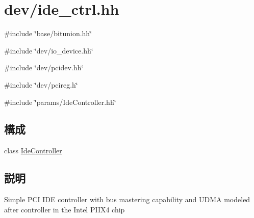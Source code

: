 \hypertarget{ide__ctrl_8hh}{
\section{dev/ide\_\-ctrl.hh}
\label{ide__ctrl_8hh}
}
{\ttfamily \#include \char`\"{}base/bitunion.hh\char`\"{}}\par
{\ttfamily \#include \char`\"{}dev/io\_\-device.hh\char`\"{}}\par
{\ttfamily \#include \char`\"{}dev/pcidev.hh\char`\"{}}\par
{\ttfamily \#include \char`\"{}dev/pcireg.h\char`\"{}}\par
{\ttfamily \#include \char`\"{}params/IdeController.hh\char`\"{}}\par
\subsection*{構成}
\begin{DoxyCompactItemize}
\item 
class \hyperlink{classIdeController}{IdeController}
\end{DoxyCompactItemize}


\subsection{説明}
Simple PCI IDE controller with bus mastering capability and UDMA modeled after controller in the Intel PIIX4 chip 